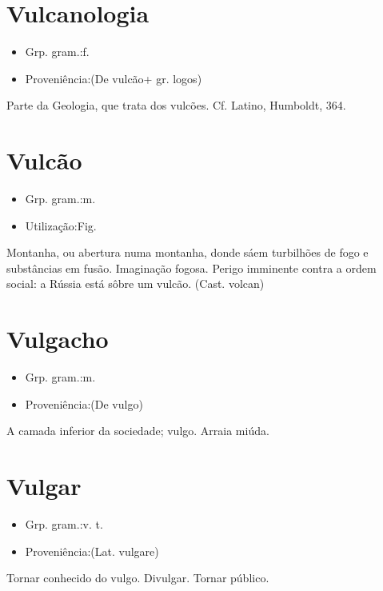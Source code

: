 \documentclass{article}
\begin{document}
\section{Vulcanologia}
\begin{itemize}
\item {Grp. gram.:f.}
\end{itemize}
\begin{itemize}
\item {Proveniência:(De \textunderscore vulcão\textunderscore  + gr. \textunderscore logos\textunderscore )}
\end{itemize}
Parte da Geologia, que trata dos vulcões. Cf. Latino, \textunderscore Humboldt\textunderscore , 364.
\section{Vulcão}
\begin{itemize}
\item {Grp. gram.:m.}
\end{itemize}
\begin{itemize}
\item {Utilização:Fig.}
\end{itemize}
Montanha, ou abertura numa montanha, donde sáem turbilhões de fogo e substâncias em fusão.
Imaginação fogosa.
Perigo imminente contra a ordem social: \textunderscore a Rússia está sôbre um vulcão\textunderscore .
(Cast. \textunderscore volcan\textunderscore )
\section{Vulgacho}
\begin{itemize}
\item {Grp. gram.:m.}
\end{itemize}
\begin{itemize}
\item {Proveniência:(De \textunderscore vulgo\textunderscore )}
\end{itemize}
A camada inferior da sociedade; vulgo.
Arraia miúda.
\section{Vulgar}
\begin{itemize}
\item {Grp. gram.:v. t.}
\end{itemize}
\begin{itemize}
\item {Proveniência:(Lat. \textunderscore vulgare\textunderscore )}
\end{itemize}
Tornar conhecido do vulgo.
Divulgar.
Tornar público.
\end{document}
